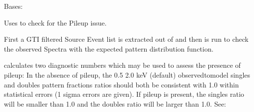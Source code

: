 \documentclass[letterpaper,10pt,english]{sphinxmanual}
\begin{document}
\begin{fulllineitems}
\label{\detokenize{xmmPipeline:xmmPipeline.epicPileup.epicPileup}}
\pysigstartsignatures
{}
\pysigstopsignatures
\sphinxAtStartPar
Bases: 

\begin{fulllineitems}
\label{\detokenize{xmmPipeline:xmmPipeline.epicPileup.epicPileup.checkPileUp}}
\pysigstartsignatures
{}
\pysigstopsignatures
\sphinxAtStartPar
Uses  to check for the Pile\sphinxhyphen{}up issue.

\sphinxAtStartPar
First a GTI filtered Source Event list is extracted out of 
and then  is run to check the observed Spectra with the expected
pattern distribution function.

\sphinxAtStartPar
{} calculates two diagnostic numbers which may be used to assess
the presence of pile\sphinxhyphen{}up: In the absence of pile\sphinxhyphen{}up, the 0.5 \sphinxhyphen{} 2.0 keV (default)
observed\sphinxhyphen{}to\sphinxhyphen{}model singles and doubles pattern fractions ratios should both be
consistent with 1.0 within statistical errors (1 sigma errors are given).
If pile\sphinxhyphen{}up is present, the singles ratio will be smaller than 1.0 and the
doubles ratio will be larger than 1.0.
See: 


\end{fulllineitems}
\end{fulllineitems}
\end{document}
